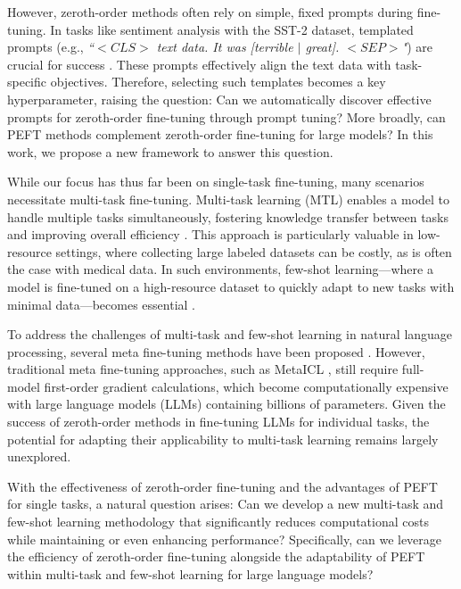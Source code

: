 However, zeroth-order methods often rely on simple, fixed prompts during fine-tuning. In tasks like sentiment analysis with the SST-2 dataset, templated prompts (e.g., \emph{``$<CLS>$ text data. It was [terrible $\mid$ great]. $<SEP>$"}) are crucial for success \cite{ZhangLHLZZCLY0W24Zobench}. These prompts effectively align the text data with task-specific objectives. Therefore, selecting such templates becomes a key hyperparameter, raising the question: Can we automatically discover effective prompts for zeroth-order fine-tuning through prompt tuning? More broadly, can PEFT methods complement zeroth-order fine-tuning for large models? In this work, we propose a new framework to answer this question. 

While our focus has thus far been on single-task fine-tuning, many scenarios necessitate multi-task fine-tuning. Multi-task learning (MTL) enables a model to handle multiple tasks simultaneously, fostering knowledge transfer between tasks and improving overall efficiency \cite{MinLZH22MetaICL, yang2024}. This approach is particularly valuable in low-resource settings, where collecting large labeled datasets can be costly, as is often the case with medical data. In such environments, few-shot learning—where a model is fine-tuned on a high-resource dataset to quickly adapt to new tasks with minimal data—becomes essential \cite{YeLR21CrossfitFewShot}.

To address the challenges of multi-task and few-shot learning in natural language processing, several meta fine-tuning methods have been proposed \cite{HuLLPDL23, ZhGWZYW24, YeLR21CrossfitFewShot, AsBKLZC24}. However, traditional meta fine-tuning approaches, such as MetaICL \cite{MinLZH22MetaICL}, still require full-model first-order gradient calculations, which become computationally expensive with large language models (LLMs) containing billions of parameters. Given the success of zeroth-order methods in fine-tuning LLMs for individual tasks, the potential for adapting their applicability to multi-task learning remains largely unexplored.

With the effectiveness of zeroth-order fine-tuning and the advantages of PEFT for single tasks, a natural question arises: Can we develop a new multi-task and few-shot learning methodology that significantly reduces computational costs while maintaining or even enhancing performance? Specifically, can we leverage the efficiency of zeroth-order fine-tuning alongside the adaptability of PEFT within multi-task and few-shot learning for large language models?


